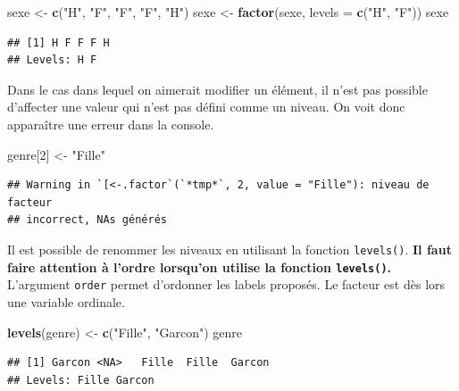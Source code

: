 \documentclass[
]{book}
\newenvironment{Shaded}{\begin{snugshade}}{\end{snugshade}}
\newcommand{\AttributeTok}[1]{\textcolor[rgb]{0.13,0.29,0.53}{#1}}
\newcommand{\DecValTok}[1]{\textcolor[rgb]{0.00,0.00,0.81}{#1}}
\newcommand{\FunctionTok}[1]{\textcolor[rgb]{0.13,0.29,0.53}{\textbf{#1}}}
\newcommand{\NormalTok}[1]{#1}
\newcommand{\OtherTok}[1]{\textcolor[rgb]{0.56,0.35,0.01}{#1}}
\newcommand{\StringTok}[1]{\textcolor[rgb]{0.31,0.60,0.02}{#1}}
\begin{document}
\begin{Shaded}
\begin{Highlighting}[]
\NormalTok{sexe }\OtherTok{\textless{}{-}} \FunctionTok{c}\NormalTok{(}\StringTok{"H"}\NormalTok{, }\StringTok{"F"}\NormalTok{, }\StringTok{"F"}\NormalTok{, }\StringTok{"F"}\NormalTok{, }\StringTok{"H"}\NormalTok{)}
\NormalTok{sexe }\OtherTok{\textless{}{-}} \FunctionTok{factor}\NormalTok{(sexe, }\AttributeTok{levels =} \FunctionTok{c}\NormalTok{(}\StringTok{"H"}\NormalTok{, }\StringTok{"F"}\NormalTok{))}
\NormalTok{sexe}
\end{Highlighting}
\end{Shaded}

\begin{verbatim}
## [1] H F F F H
## Levels: H F
\end{verbatim}

Dans le cas dans lequel on aimerait modifier un élément, il n'est pas possible d'affecter une valeur qui n'est pas défini comme un niveau. On voit donc apparaître une erreur dans la console.

\begin{Shaded}
\begin{Highlighting}[]
\NormalTok{genre[}\DecValTok{2}\NormalTok{] }\OtherTok{\textless{}{-}} \StringTok{"Fille"}
\end{Highlighting}
\end{Shaded}

\begin{verbatim}
## Warning in `[<-.factor`(`*tmp*`, 2, value = "Fille"): niveau de facteur
## incorrect, NAs générés
\end{verbatim}

Il est possible de renommer les niveaux en utilisant la fonction \texttt{levels()}. \textbf{Il faut faire attention à l'ordre lorsqu'on utilise la fonction \texttt{levels()}.} L'argument \texttt{order} permet d'ordonner les labels proposés. Le facteur est dès lors une variable ordinale.

\begin{Shaded}
\begin{Highlighting}[]
\FunctionTok{levels}\NormalTok{(genre) }\OtherTok{\textless{}{-}} \FunctionTok{c}\NormalTok{(}\StringTok{"Fille"}\NormalTok{, }\StringTok{"Garcon"}\NormalTok{)}
\NormalTok{genre}
\end{Highlighting}
\end{Shaded}

\begin{verbatim}
## [1] Garcon <NA>   Fille  Fille  Garcon
## Levels: Fille Garcon
\end{verbatim}
\end{document}
